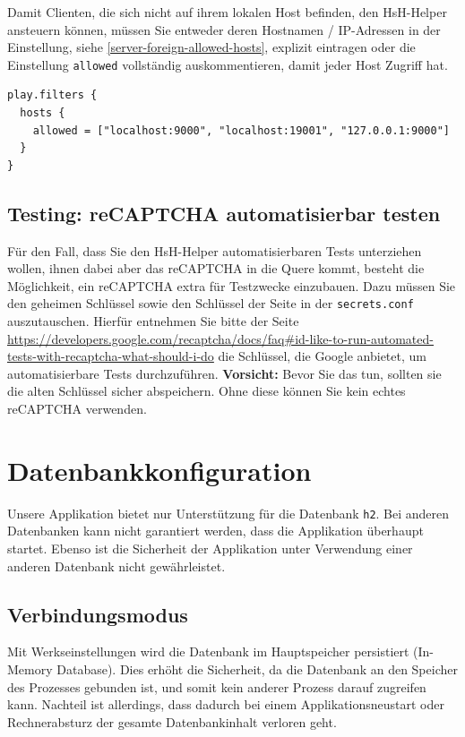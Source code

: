\documentclass[12pt,DIV14,BCOR10mm,a4paper,parskip=half-,headsepline,headinclude,english,ngerman,bibliography=totocnumbered]{scrreprt}
\begin{document}
Damit Clienten, die sich nicht auf ihrem lokalen Host befinden, den HsH-Helper ansteuern können, müssen Sie entweder deren Hostnamen / IP-Adressen in der Einstellung, siehe \autoref{server-foreign-allowed-hosts}, explizit eintragen oder die Einstellung \texttt{allowed} vollständig auskommentieren, damit jeder Host Zugriff hat.

\begin{lstlisting}[label=server-foreign-allowed-hosts, caption={"Erlaubte Hosts"-Einstellung innerhalb der Konfigurationsdatei},captionpos=b]
play.filters {
  hosts {
    allowed = ["localhost:9000", "localhost:19001", "127.0.0.1:9000"]
  }
}
\end{lstlisting}

\subsection{Testing: reCAPTCHA automatisierbar testen}

Für den Fall, dass Sie den HsH-Helper automatisierbaren Tests unterziehen wollen, ihnen dabei aber das reCAPTCHA in die Quere kommt, besteht die Möglichkeit, ein reCAPTCHA extra für Testzwecke einzubauen.
Dazu müssen Sie den geheimen Schlüssel sowie den Schlüssel der Seite in der \texttt{secrets.conf} auszutauschen.
Hierfür entnehmen Sie bitte der Seite \url{https://developers.google.com/recaptcha/docs/faq\#id-like-to-run-automated-tests-with-recaptcha-what-should-i-do} die Schlüssel, die Google anbietet, um automatisierbare Tests durchzuführen.
\textbf{Vorsicht:} Bevor Sie das tun, sollten sie die alten Schlüssel sicher abspeichern.
Ohne diese können Sie kein echtes reCAPTCHA verwenden.

\section{Datenbankkonfiguration}

Unsere Applikation bietet nur Unterstützung für die Datenbank \texttt{h2}.
Bei anderen Datenbanken kann nicht garantiert werden, dass die Applikation überhaupt startet.
Ebenso ist die Sicherheit der Applikation unter Verwendung einer anderen Datenbank nicht gewährleistet.

\subsection{Verbindungsmodus}

Mit Werkseinstellungen wird die Datenbank im Hauptspeicher persistiert (In-Memory Database).
Dies erhöht die Sicherheit, da die Datenbank an den Speicher des Prozesses gebunden ist, und somit kein anderer Prozess darauf zugreifen kann.
Nachteil ist allerdings, dass dadurch bei einem Applikationsneustart oder Rechnerabsturz der gesamte Datenbankinhalt verloren geht.
\end{document}
